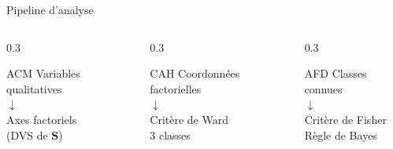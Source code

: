 \documentclass[aspectratio=169, 10pt]{beamer}
\begin{document}
\begin{frame}{Pipeline d'analyse}
    \vspace{10pt}
    \begin{columns}[T]
        \begin{column}{0.3\textwidth}
            \begin{block}{\hfill ACM\hfill}
                \centering\scriptsize
                Variables qualitatives\\
                $\downarrow$\\
                Axes factoriels\\
                (DVS de $\mathbf{S}$)
            \end{block}
        \end{column}
        \begin{column}{0.3\textwidth}
            \begin{block}{\hfill CAH\hfill}
                \centering\scriptsize
                Coordonnées factorielles\\
                $\downarrow$\\
                Critère de Ward\\
                3 classes
            \end{block}
        \end{column}
        \begin{column}{0.3\textwidth}
            \begin{block}{\hfill AFD\hfill}
                \centering\scriptsize
                Classes connues\\
                $\downarrow$\\
                Critère de Fisher\\
                Règle de Bayes
            \end{block}
        \end{column}
    \end{columns}
\end{frame}
\end{document}
